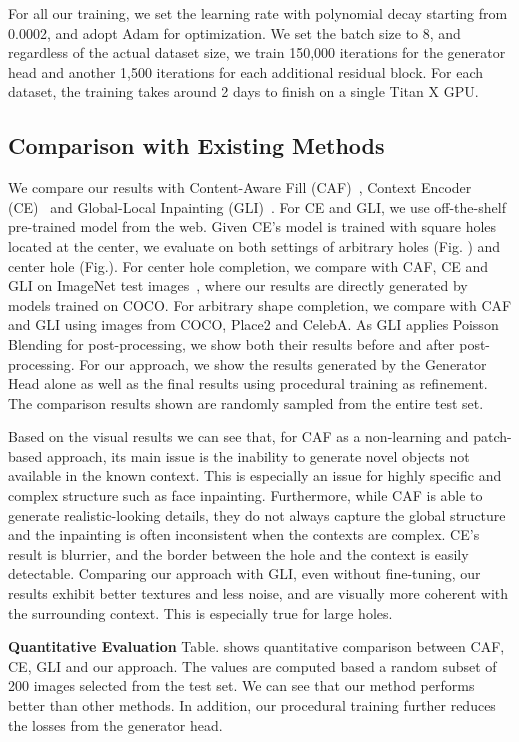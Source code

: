 For all our training, we set the learning rate with polynomial decay starting from 0.0002, and adopt Adam for optimization. We set the batch size to 8, and regardless of the actual dataset size, we train 150,000 iterations for the generator head and another 1,500 iterations for each additional residual block. For each dataset, the training takes around 2 days to finish on a single Titan X GPU. 

\subsection{Comparison with Existing Methods}
\label{exp:comparison}
We compare our results with Content-Aware Fill (CAF)~\cite{barnes2009patchmatch}, Context Encoder (CE)~\cite{pathak2016context} and Global-Local Inpainting (GLI)~\cite{iizuka2017globally}. For CE and GLI, we use off-the-shelf pre-trained model from the web. Given CE's model is trained with square holes located at the center, we evaluate on both settings of arbitrary holes (Fig. ) and center hole (Fig.). For center hole completion, we compare with CAF, CE and GLI on ImageNet test images~\cite{russakovsky2015imagenet}, where our results are directly generated by models trained on COCO. For arbitrary shape completion, we compare with CAF and GLI using images from COCO, Place2 and CelebA. As GLI applies Poisson Blending for post-processing, we show both their results before and after post-processing. For our approach, we show the results generated by the Generator Head alone as well as the final results using procedural training as refinement. The comparison results shown are randomly sampled from the entire test set.

Based on the visual results we can see that, for CAF as a non-learning and patch-based approach, its main issue is the inability to generate novel objects not available in the known context. This is especially an issue for highly specific and complex structure such as face inpainting. Furthermore, while CAF is able to generate realistic-looking details, they do not always capture the global structure and the inpainting is often inconsistent when the contexts are complex. CE's result is blurrier, and the border between the hole and the context is easily detectable. Comparing our approach with GLI, even without fine-tuning, our results exhibit better textures and less noise, and are visually more coherent with the surrounding context. This is especially true for large holes. 

\noindent\textbf{Quantitative Evaluation} Table. shows quantitative comparison between CAF, CE, GLI and our approach. The values are computed based a random subset of 200 images selected from the test set. We can see that our method performs better than other methods. In addition, our procedural training further reduces the losses from the generator head.

